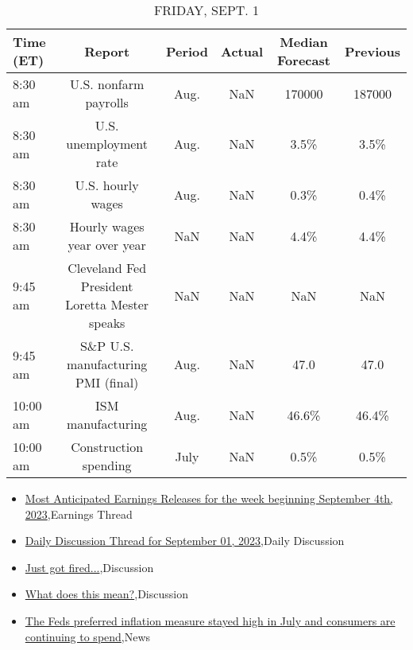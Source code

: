 \documentclass{article}%
\begin{document}
\begin{table}[htbp]%
\caption{FRIDAY, SEPT. 1}%
\centering%
\begin{adjustbox}{width=1\textwidth}%
\begin{tabular}{lccccc}
\toprule
Time (ET) &                                        Report & Period & Actual & Median Forecast & Previous \\
\midrule
  8:30 am &                         U.S. nonfarm payrolls &   Aug. &    NaN &          170000 &   187000 \\
  8:30 am &                        U.S. unemployment rate &   Aug. &    NaN &            3.5\% &     3.5\% \\
  8:30 am &                             U.S. hourly wages &   Aug. &    NaN &            0.3\% &     0.4\% \\
  8:30 am &                   Hourly wages year over year &    NaN &    NaN &            4.4\% &     4.4\% \\
  9:45 am & Cleveland Fed President Loretta Mester speaks &    NaN &    NaN &             NaN &      NaN \\
  9:45 am &            S\&P U.S. manufacturing PMI (final) &   Aug. &    NaN &            47.0 &     47.0 \\
 10:00 am &                             ISM manufacturing &   Aug. &    NaN &           46.6\% &    46.4\% \\
 10:00 am &                         Construction spending &   July &    NaN &            0.5\% &     0.5\% \\
\bottomrule
\end{tabular}
%
\end{adjustbox}%
\end{table}

%
\begin{itemize}%
\item%
\href{https://reddit.com/r/wallstreetbets/comments/1675xa7/most\_anticipated\_earnings\_releases\_for\_the\_week/}{Most Anticipated Earnings Releases for the week beginning September 4th, 2023},Earnings Thread%
\item%
\href{https://reddit.com/r/wallstreetbets/comments/1672xpu/daily\_discussion\_thread\_for\_september\_01\_2023/}{Daily Discussion Thread for September 01, 2023},Daily Discussion%
\item%
\href{https://reddit.com/r/StockMarket/comments/166pcb1/just\_got\_fired/}{Just got fired...},Discussion%
\item%
\href{https://reddit.com/r/StockMarket/comments/166cjvp/what\_does\_this\_mean/}{What does this mean?},Discussion%
\item%
\href{https://reddit.com/r/Economics/comments/166p299/the\_feds\_preferred\_inflation\_measure\_stayed\_high/}{The Feds preferred inflation measure stayed high in July  and consumers are continuing to spend},News%
\end{itemize}%
\end{document}
